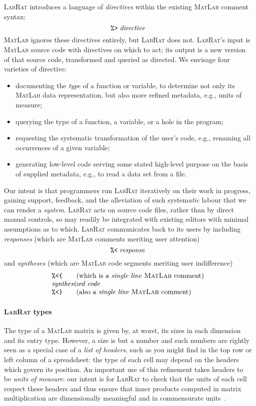 \documentclass{ws-procs9x6}
\newcommand{\pct}{\texttt{\symbol{37}}}
\newcommand{\dir}{\texttt{\symbol{62}}}
\newcommand{\res}{\texttt{\symbol{60}}}
\newcommand{\lcb}{\texttt{\symbol{123}}}
\newcommand{\rcb}{\texttt{\symbol{125}}}
\newcommand{\lr}{\textsc{LabRat}}
\newcommand{\ma}{\textsc{MatLab}}
\newcommand{\remph}{\emph}
\begin{document}
\lr{} introduces a language of \emph{directives} within the existing \ma{} comment syntax:
\[\pct\dir\;\mathit{directive}
\]
\ma{} ignores these directives entirely, but \lr{} does not. \lr's input is \ma{} source code with directives on which to act; its output is a new version of that source code, transformed and queried as directed. We envisage four varieties of directive:
\begin{itemize}
\item documenting the \remph{type} of a function or variable, to determine not only its \ma{} data representation, but also more refined metadata, e.g., units of measure;
\item querying the type of a function, a variable, or a hole in the program;
\item requesting the systematic transformation of the user's code, e.g., renaming all occurrences of a given variable;
\item generating low-level code serving some stated high-level purpose on the basis of supplied metadata, e.g., to read a data set from a file.
\end{itemize}
Our intent is that programmers run \lr{} iteratively on their work in progress, gaining support, feedback, and the alleviation of such system\remph{atic} labour that we can render a \remph{system}. \lr{} acts on source code files, rather than by direct manual controls, so may readily be integrated with existing editors with minimal assumptions as to which. \lr{} communicates back to its users by including \emph{responses} (which are \ma{} comments meriting user attention)
\[
\pct\res\;\mathit{response}
\]
and \emph{syntheses} (which are \ma{} code segments meriting user indifference)
\[\begin{array}{l}
\pct\res\lcb\qquad \mbox{(which is a \remph{single line} \ma{} comment)}\\
\mathit{synthesized}\; \mathit{code}\\
\pct\res\rcb\qquad \mbox{(also a \remph{single line} \ma{} comment)} \\
\end{array}\]

\paragraph{\lr{} types}

The type of a \ma{} matrix is given by, at worst, its sizes in each dimension and its entry type. However, a size is but a number and such numbers are rightly seen as a special case of a \remph{list of headers}, such as you might find in the top row or left column of a spreadsheet: the type of each cell may depend on the headers which govern its position. An important use of this refinement takes headers to be \remph{units of measure}: our intent is for \lr{} to check that the units of each cell respect these headers and thus ensure that inner products computed in matrix multiplication are dimensionally meaningful and in commensurate units~\cite{dimTypes}.
\end{document}
